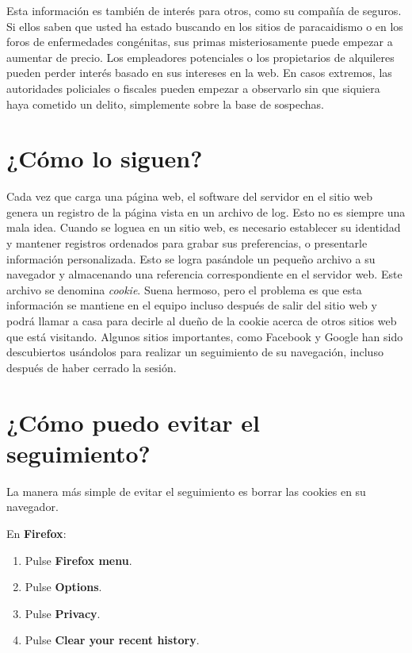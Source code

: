 \documentclass[10pt,a5paper,twoside,,]{book}
\providecommand{\tightlist}{%
  \setlength{\itemsep}{0pt}\setlength{\parskip}{0pt}}
\begin{document}
Esta información es también de interés para otros, como su compañía de
seguros. Si ellos saben que usted ha estado buscando en los sitios de
paracaidismo o en los foros de enfermedades congénitas, sus primas
misteriosamente puede empezar a aumentar de precio. Los empleadores
potenciales o los propietarios de alquileres pueden perder interés
basado en sus intereses en la web. En casos extremos, las autoridades
policiales o fiscales pueden empezar a observarlo sin que siquiera haya
cometido un delito, simplemente sobre la base de sospechas.

\section{¿Cómo lo siguen?}\label{cuxf3mo-lo-siguen}

Cada vez que carga una página web, el software del servidor en el sitio
web genera un registro de la página vista en un archivo de log. Esto no
es siempre una mala idea. Cuando se loguea en un sitio web, es necesario
establecer su identidad y mantener registros ordenados para grabar sus
preferencias, o presentarle información personalizada. Esto se logra
pasándole un pequeño archivo a su navegador y almacenando una referencia
correspondiente en el servidor web. Este archivo se denomina
\emph{cookie}. Suena hermoso, pero el problema es que esta información
se mantiene en el equipo incluso después de salir del sitio web y podrá
llamar a casa para decirle al dueño de la cookie acerca de otros sitios
web que está visitando. Algunos sitios importantes, como Facebook y
Google han sido descubiertos usándolos para realizar un seguimiento de
su navegación, incluso después de haber cerrado la sesión.

\section{¿Cómo puedo evitar el
seguimiento?}\label{cuxf3mo-puedo-evitar-el-seguimiento}

La manera más simple de evitar el seguimiento es borrar las cookies en
su navegador.

En \textbf{Firefox}:

\begin{enumerate}
\def\labelenumi{\arabic{enumi}.}
\tightlist
\item
  Pulse \textbf{Firefox menu}.
\item
  Pulse \textbf{Options}.
\item
  Pulse \textbf{Privacy}.
\item
  Pulse \textbf{Clear your recent history}.
\end{enumerate}
\end{document}
